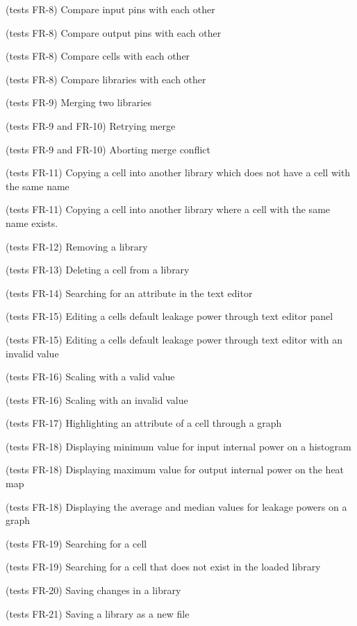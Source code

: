 \documentclass[10pt,a4paper]{report}
\begin{document}
\begin{GTC}
    \item  (tests FR-8) Compare input pins with each other
    \item  (tests FR-8) Compare output pins with each other
    \item  (tests FR-8) Compare cells with each other
    \item  (tests FR-8) Compare libraries with each other
    \item  (tests FR-9) Merging two libraries
    \item  (tests FR-9 and FR-10) Retrying merge
    \item  (tests FR-9 and FR-10) Aborting merge conflict
    \item  (tests FR-11) Copying a cell into another library which does not have a cell with the same name
    \item  (tests FR-11) Copying a cell into another library where a cell with the same name exists.
    \item  (tests FR-12) Removing a library
    \item  (tests FR-13) Deleting a cell from a library
    \item  (tests FR-14) Searching for an attribute in the text editor
    \item  (tests FR-15) Editing a cells default leakage power through text editor panel
    \item  (tests FR-15) Editing a cells default leakage power through text editor with an invalid value
    \item  (tests FR-16) Scaling with a valid value
    \item  (tests FR-16) Scaling with an invalid value
    \item  (tests FR-17) Highlighting an attribute of a cell through a graph
    \item  (tests FR-18)  Displaying minimum value for input internal power on a histogram
    \item  (tests FR-18)  Displaying maximum value for output internal power on the heat map
    \item  (tests FR-18)  Displaying the average and median values for leakage powers on a graph
    \item  (tests FR-19) Searching for a cell
    \item  (tests FR-19) Searching for a cell that does not exist in the loaded library
    \item  (tests FR-20) Saving changes in a library
    \item  (tests FR-21) Saving a library as a new file
    
\end{GTC}
\end{document}
